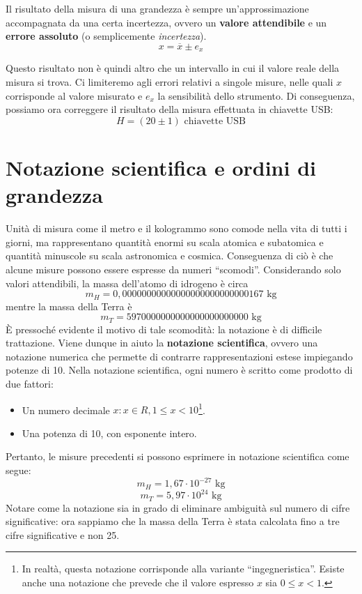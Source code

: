 \vspace{8pt}
\begin{tcolorbox}[colback = yellow!30, colframe = yellow!30!black, title = {Risultato della misura di una grandezza}]
Il risultato della misura di una grandezza è sempre un'approssimazione
accompagnata da una certa incertezza, ovvero un \textbf{valore attendibile}
e un \textbf{errore assoluto} (o semplicemente \textit{incertezza}).
\[ x = \overline{x} \pm e_x  \]
\end{tcolorbox}
\vspace{5pt}

Questo risultato non è quindi altro che un intervallo in cui il valore reale
della misura si trova. Ci limiteremo agli errori relativi a singole misure,
nelle quali $x$ corrisponde al valore misurato e $e_x$ la sensibilità dello
strumento. Di conseguenza, possiamo ora correggere il risultato della misura
effettuata in chiavette USB:
\[ H = (20 \pm 1) \text{ chiavette USB} \]

\section{Notazione scientifica e ordini di grandezza}
Unità di misura come il metro e il kologrammo sono comode nella vita di tutti i
giorni, ma rappresentano quantità enormi su scala atomica e subatomica e quantità
minuscole su scala astronomica e cosmica. Conseguenza di ciò è che alcune misure
possono essere espresse da numeri ``scomodi''. Considerando solo valori attendibili,
la massa dell'atomo di idrogeno è circa
\[ m_H = 0,000 000 000 000 000 000 000 000 001 67 \text{ kg} \]
mentre la massa della Terra è
\[ m_T = 5 970 000 000 000 000 000 000 000 \text{ kg} \]
È pressoché evidente il motivo di tale scomodità: la notazione è di difficile
trattazione. Viene dunque in aiuto la \textbf{notazione scientifica}, ovvero una
notazione numerica che permette di contrarre rappresentazioni estese impiegando
potenze di 10. Nella notazione scientifica, ogni numero è scritto come prodotto
di due fattori:
\begin{itemize}
    \item Un numero decimale $x:x\in R, 1\leq x < 10$\footnote{In realtà, questa notazione corrisponde alla variante ``ingegneristica''. Esiste anche una notazione che prevede che il valore espresso $x$ sia $0\leq x < 1$.}.
    \item Una potenza di 10, con esponente intero.
\end{itemize}
Pertanto, le misure precedenti si possono esprimere in notazione scientifica come
segue:
\[ m_H = 1,67 \cdot 10^{-27} \text{ kg} \]
\[ m_T = 5,97 \cdot 10^{24} \text{ kg}\]
Notare come la notazione sia in grado di eliminare ambiguità sul numero di cifre
significative: ora sappiamo che la massa della Terra è stata calcolata fino a
tre cifre significative e non 25.

